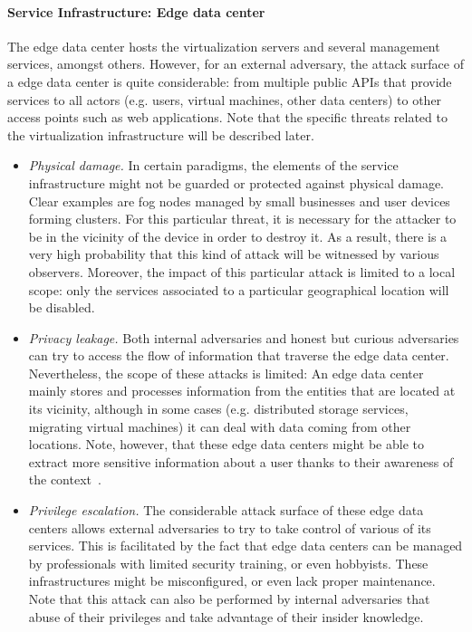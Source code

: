 \documentclass[twocolumn,preprint,3p]{elsarticle}
\begin{document}
\paragraph{Service Infrastructure: Edge data center} The edge data center hosts the virtualization servers and several management services, amongst others. However, for an external adversary, the attack surface of a edge data center is quite considerable: from multiple public APIs that provide services to all actors (e.g. users, virtual machines, other data centers) to other access points such as web applications. Note that the specific threats related to the virtualization infrastructure will be described later.
    \begin{itemize}
      \item \textit{Physical damage.} In certain paradigms, the elements of the service infrastructure might not be guarded or protected against physical damage. Clear examples are fog nodes managed by small businesses and user devices forming clusters. For this particular threat, it is necessary for the attacker to be in the vicinity of the device in order to destroy it. As a result, there is a very high probability that this kind of attack will be witnessed by various observers. Moreover, the impact of this particular attack is limited to a local scope: only the services associated to a particular geographical location will be disabled.
      \item \textit{Privacy leakage.} Both internal adversaries and honest but curious adversaries can try to access the flow of information that traverse the edge data center. Nevertheless, the scope of these attacks is limited: An edge data center mainly stores and processes information from the entities that are located at its vicinity, although in some cases (e.g. distributed storage services, migrating virtual machines) it can deal with data coming from other locations. Note, however, that these edge data centers might be able to extract more sensitive information about a user thanks to their awareness of the context~\cite{Shanhe15}.
      \item \textit{Privilege escalation.} The considerable attack surface of these edge data centers allows external adversaries to try to take control of various of its services. This is facilitated by the fact that edge data centers can be managed by professionals with limited security training, or even hobbyists. These infrastructures might be misconfigured, or even lack proper maintenance. Note that this attack can also be performed by internal adversaries that abuse of their privileges and take advantage of their insider knowledge.

\end{itemize}
\end{document}
